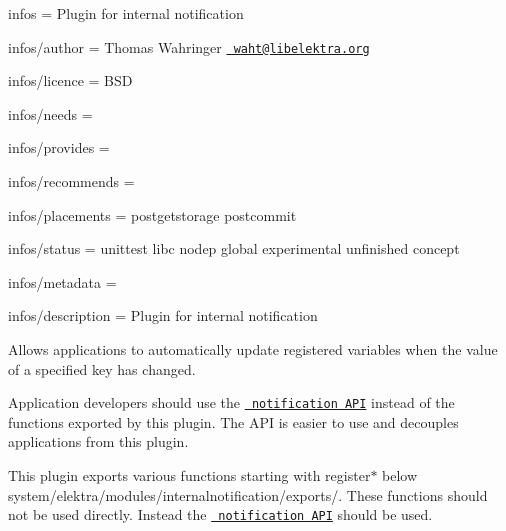 
\begin{DoxyItemize}
\item infos = Plugin for internal notification
\item infos/author = Thomas Wahringer \href{mailto:waht@libelektra.org}{\texttt{ waht@libelektra.\+org}}
\item infos/licence = B\+SD
\item infos/needs =
\item infos/provides =
\item infos/recommends =
\item infos/placements = postgetstorage postcommit
\item infos/status = unittest libc nodep global experimental unfinished concept
\item infos/metadata =
\item infos/description = Plugin for internal notification
\end{DoxyItemize}

Allows applications to automatically update registered variables when the value of a specified key has changed.

Application developers should use the \href{https://doc.libelektra.org/api/current/html/group__kdbnotification.html}{\texttt{ notification A\+PI}} instead of the functions exported by this plugin. The A\+PI is easier to use and decouples applications from this plugin.

This plugin exports various functions starting with {\ttfamily register$\ast$} below {\ttfamily system/elektra/modules/internalnotification/exports/}. These functions should not be used directly. Instead the \href{https://doc.libelektra.org/api/current/html/group__kdbnotification.html}{\texttt{ notification A\+PI}} should be used. 